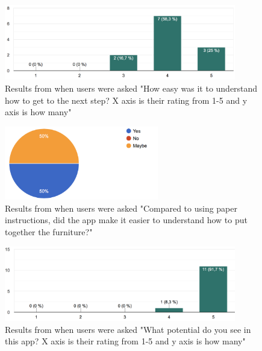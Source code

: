 \begin{figure}[hbtp]
\begin{center}
\includegraphics[width = 0.9\textwidth]{./Images/easyToUse.png}
\caption{Results from when users were asked "How easy was it to understand how to get to the next step? X axis is their rating from 1-5 and y axis is how many"}
\label{fig:question4}
\end{center}
\end{figure}

\begin{figure}[hbtp]
\begin{center}
\includegraphics[width = 0.6\textwidth]{./Images/comparedTo.png}
\caption{Results from when users were asked "Compared to using paper instructions, did the app make it easier to understand how to put together the furniture?"}
\label{fig:question5}
\end{center}
\end{figure}

\begin{figure}[hbtp]
\begin{center}
\includegraphics[width = 0.9\textwidth]{./Images/potential.png}
\caption{Results from when users were asked "What potential do you see in this app? X axis is their rating from 1-5 and y axis is how many"}
\label{fig:question6}
\end{center}
\end{figure}


